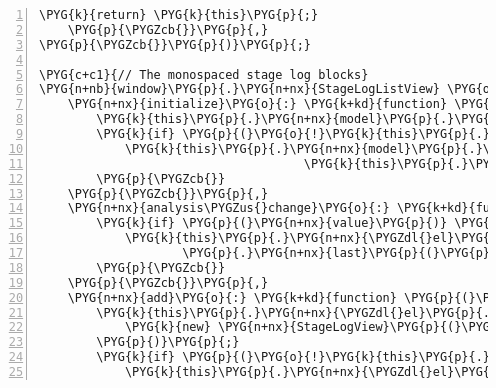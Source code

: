 \begin{Verbatim}[commandchars=\\\{\},numbers=left,firstnumber=1,stepnumber=5]
        \PYG{k}{return} \PYG{k}{this}\PYG{p}{;}
    \PYG{p}{\PYGZcb{}}\PYG{p}{,}
\PYG{p}{\PYGZcb{}}\PYG{p}{)}\PYG{p}{;}

\PYG{c+c1}{// The monospaced stage log blocks}
\PYG{n+nb}{window}\PYG{p}{.}\PYG{n+nx}{StageLogListView} \PYG{o}{=} \PYG{n+nx}{Backbone}\PYG{p}{.}\PYG{n+nx}{View}\PYG{p}{.}\PYG{n+nx}{extend}\PYG{p}{(}\PYG{p}{\PYGZob{}}
    \PYG{n+nx}{initialize}\PYG{o}{:} \PYG{k+kd}{function} \PYG{p}{(}\PYG{p}{)} \PYG{p}{\PYGZob{}}
        \PYG{k}{this}\PYG{p}{.}\PYG{n+nx}{model}\PYG{p}{.}\PYG{n+nx}{bind}\PYG{p}{(}\PYG{l+s+s2}{"add"}\PYG{p}{,} \PYG{k}{this}\PYG{p}{.}\PYG{n+nx}{add}\PYG{p}{,} \PYG{k}{this}\PYG{p}{)}\PYG{p}{;}
        \PYG{k}{if} \PYG{p}{(}\PYG{o}{!}\PYG{k}{this}\PYG{p}{.}\PYG{n+nx}{model}\PYG{p}{.}\PYG{n+nx}{analysis}\PYG{p}{.}\PYG{n+nx}{get}\PYG{p}{(}\PYG{l+s+s1}{'finished'}\PYG{p}{)}\PYG{p}{)} \PYG{p}{\PYGZob{}}
            \PYG{k}{this}\PYG{p}{.}\PYG{n+nx}{model}\PYG{p}{.}\PYG{n+nx}{analysis}\PYG{p}{.}\PYG{n+nx}{bind}\PYG{p}{(}\PYG{l+s+s2}{"change:finished"}\PYG{p}{,}
                                     \PYG{k}{this}\PYG{p}{.}\PYG{n+nx}{analysis\PYGZus{}change}\PYG{p}{,} \PYG{k}{this}\PYG{p}{)}\PYG{p}{;}
        \PYG{p}{\PYGZcb{}}
    \PYG{p}{\PYGZcb{}}\PYG{p}{,}
    \PYG{n+nx}{analysis\PYGZus{}change}\PYG{o}{:} \PYG{k+kd}{function} \PYG{p}{(}\PYG{n+nx}{model}\PYG{p}{,} \PYG{n+nx}{value}\PYG{p}{,} \PYG{n+nx}{options}\PYG{p}{)} \PYG{p}{\PYGZob{}}
        \PYG{k}{if} \PYG{p}{(}\PYG{n+nx}{value}\PYG{p}{)} \PYG{p}{\PYGZob{}}
            \PYG{k}{this}\PYG{p}{.}\PYG{n+nx}{\PYGZdl{}el}\PYG{p}{.}\PYG{n+nx}{contents}\PYG{p}{(}\PYG{p}{)}\PYG{p}{.}\PYG{n+nx}{find}\PYG{p}{(}\PYG{l+s+s2}{"pre"}\PYG{p}{)}
                    \PYG{p}{.}\PYG{n+nx}{last}\PYG{p}{(}\PYG{p}{)}\PYG{p}{.}\PYG{n+nx}{css}\PYG{p}{(}\PYG{l+s+s1}{'background-color'}\PYG{p}{,} \PYG{l+s+s1}{''}\PYG{p}{)}\PYG{p}{;}
        \PYG{p}{\PYGZcb{}}
    \PYG{p}{\PYGZcb{}}\PYG{p}{,}
    \PYG{n+nx}{add}\PYG{o}{:} \PYG{k+kd}{function} \PYG{p}{(}\PYG{n+nx}{model}\PYG{p}{)} \PYG{p}{\PYGZob{}}
        \PYG{k}{this}\PYG{p}{.}\PYG{n+nx}{\PYGZdl{}el}\PYG{p}{.}\PYG{n+nx}{append}\PYG{p}{(}
            \PYG{k}{new} \PYG{n+nx}{StageLogView}\PYG{p}{(}\PYG{p}{\PYGZob{}}\PYG{n+nx}{model}\PYG{o}{:} \PYG{n+nx}{model}\PYG{p}{\PYGZcb{}}\PYG{p}{)}\PYG{p}{.}\PYG{n+nx}{render}\PYG{p}{(}\PYG{p}{)}\PYG{p}{.}\PYG{n+nx}{el}
        \PYG{p}{)}\PYG{p}{;}
        \PYG{k}{if} \PYG{p}{(}\PYG{o}{!}\PYG{k}{this}\PYG{p}{.}\PYG{n+nx}{model}\PYG{p}{.}\PYG{n+nx}{analysis}\PYG{p}{.}\PYG{n+nx}{get}\PYG{p}{(}\PYG{l+s+s1}{'finished'}\PYG{p}{)}\PYG{p}{)} \PYG{p}{\PYGZob{}}
            \PYG{k}{this}\PYG{p}{.}\PYG{n+nx}{\PYGZdl{}el}\PYG{p}{.}\PYG{n+nx}{contents}\PYG{p}{(}\PYG{p}{)}\PYG{p}{.}\PYG{n+nx}{find}\PYG{p}{(}\PYG{l+s+s2}{"pre"}\PYG{p}{)}

\end{Verbatim}

